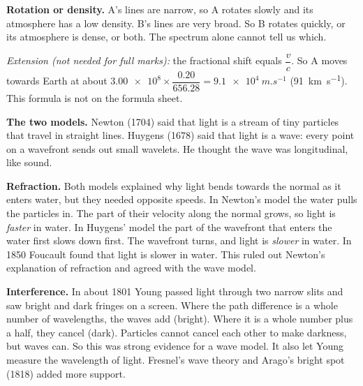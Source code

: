 \begin{practiceanswers}
\begin{practiceans}
\begin{modelanswer}
  \textbf{Rotation or density.} A's lines are narrow, so A rotates slowly and its atmosphere has
  a low density. B's lines are very broad. So B rotates quickly, or its atmosphere is dense, or
  both. The spectrum alone cannot tell us which.
  \end{modelanswer}
  \textit{Extension (not needed for full marks):} the fractional shift equals $\dfrac{v}{c}$. So
  A moves towards Earth at about
  $\num{3.00e8} \times \dfrac{0.20}{656.28} = \qty{9.1e4}{m.s^{-1}}$ (\qty{91}{km.s^{-1}}). This
  formula is not on the formula sheet.
  \begin{markingcriteria}
  \end{markingcriteria}
\end{practiceans}

\begin{practiceans}
  \begin{modelanswer}
  \textbf{The two models.} Newton (1704) said that light is a stream of tiny particles that
  travel in straight lines. Huygens (1678) said that light is a wave: every point on a wavefront
  sends out small wavelets. He thought the wave was longitudinal, like sound.

  \textbf{Refraction.} Both models explained why light bends towards the normal as it enters
  water, but they needed opposite speeds. In Newton's model the water pulls the particles in.
  The part of their velocity along the normal grows, so light is \emph{faster} in water. In
  Huygens' model the part of the wavefront that enters the water first slows down first. The
  wavefront turns, and light is \emph{slower} in water. In 1850 Foucault found that light is
  slower in water. This ruled out Newton's explanation of refraction and agreed with the wave
  model.

  \textbf{Interference.} In about 1801 Young passed light through two narrow slits and saw bright
  and dark fringes on a screen. Where the path difference is a whole number of wavelengths, the
  waves add (bright). Where it is a whole number plus a half, they cancel (dark). Particles
  cannot cancel each other to make darkness, but waves can. So this was strong evidence for a
  wave model. It also let Young measure the wavelength of light. Fresnel's wave theory and
  Arago's bright spot (1818) added more support.


\end{modelanswer}
\end{practiceans}
\end{practiceanswers}
